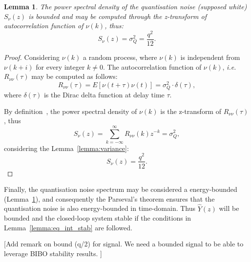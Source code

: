 \documentclass{sig-alternate-05-2015}
\newcommand{\red}[1]{{\color{red}#1}}
\newtheorem{mylemma}{Lemma}
\begin{document}
\begin{mylemma}
\label{lemma:boundednoise}
The power spectral density of the quantisation noise (supposed white) $S_{\nu}(z)$ is bounded and may be computed through the z-transform of autocorrelation function of $\nu(k)$, thus:
\begin{equation}
S_{\nu}(z)= \sigma_{Q}^{2}=\frac{q^{2}}{12}.
\end{equation}
\end{mylemma}

\begin{proof}
Considering $\nu(k)$ a random process, where $\nu(k)$ is independent from $\nu(k+i)$ for every  integer $k\neq 0$. The autocorrelation function of $\nu(k)$, {\it i.e.} $R_{\nu\nu}(\tau)$ may be computed as follows:
\begin{equation}
R_{\nu\nu}(\tau)=E[\nu(t+\tau)\nu(t)]=\sigma_{Q}^{2}\cdot \delta(\tau),
\end{equation}
where $\delta(\tau)$ is the Dirac delta function at delay time $\tau$.

By definition~\cite{poularikas2000transforms}, the power spectral density of  $\nu(k)$ is the z-transform of $R_{\nu\nu}(\tau)$, thus
\begin{equation}
S_{\nu}(z)=  \sum\limits_{k=-\infty}^{\infty}{R_{\nu\nu}(k)z^{-k}} = \sigma_{Q}^{2},
\end{equation}
considering the Lemma~\ref{lemma:variance}:
\begin{equation}
S_{\nu}(z)=  \frac{q^{2}}{12}.
\end{equation}
\end{proof}

Finally, the quantisation noise spectrum may be considered a energy-bounded (Lemma~\ref{lemma:boundednoise}), and consequently the Parseval's theorem ensures that the quantisation noise is also energy-bounded in time-domain.  Thus $\hat{Y}(z)$ will be bounded and the closed-loop system stable if the conditions in Lemma~\ref{lemma:eq_int_stab} are followed.

\red{[Add remark on bound (q/2) for signal. We need a bounded signal to be able to leverage BIBO stability results. ]}
\end{document}
